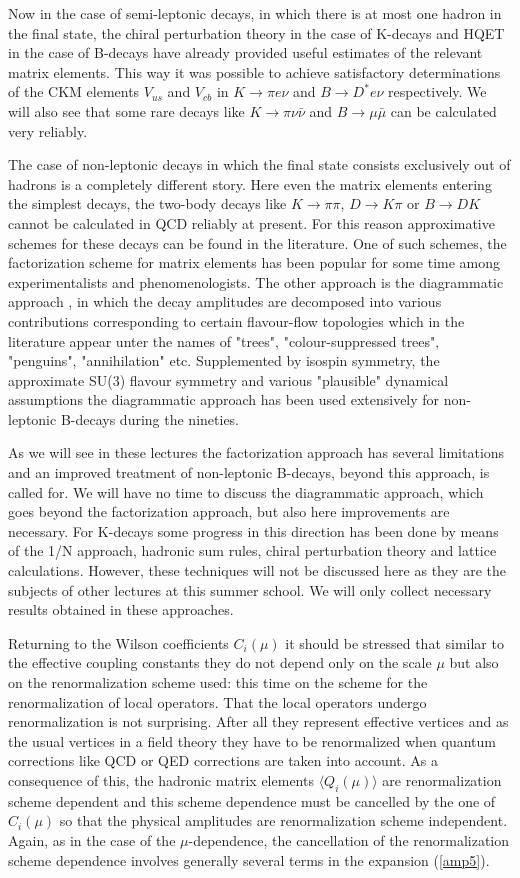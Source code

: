 \documentclass[12pt,rotate]{article}
\begin{document}
Now in the case of semi-leptonic decays, in which there is at most one hadron
in the final state, the chiral perturbation theory in the case of K-decays
and HQET in the case of B-decays have already provided useful estimates of
the relevant matrix elements. This way it was possible to achieve
satisfactory determinations of the CKM elements $V_{us}$ and $V_{cb}$ in 
$K\to\pi e\nu$ and $B\to D^*e\nu$ respectively. 
We will also see that some rare decays like $K\to\pi\nu\bar\nu$ and
$B\to\mu\bar\mu$ can be calculated very reliably.

The case of non-leptonic decays in which the final state consists exclusively
out of hadrons is a completely different story. Here even the matrix
elements entering the simplest decays, the two-body decays like 
$K\to\pi\pi$, $D\to K\pi$ or $B\to DK$ cannot be
calculated in QCD reliably at present. For this reason approximative schemes
for these decays can be found in the literature. One of such schemes, the
factorization scheme for matrix elements has been popular for some time among
experimentalists and phenomenologists. The other approach is the diagrammatic
approach \cite{DIAG}, 
in which the decay amplitudes are decomposed into various
contributions corresponding to certain flavour-flow topologies which in the
literature appear unter the names of "trees", "colour-suppressed trees",
"penguins", "annihilation" etc. Supplemented by isospin symmetry, the
approximate SU(3) flavour symmetry and various "plausible" dynamical
assumptions the diagrammatic approach has been used extensively for
non-leptonic B-decays during the nineties.

As we will see in these lectures the factorization approach 
has several limitations and an improved treatment of
non-leptonic B-decays, beyond this approach, is called for. 
We will have no time to discuss the diagrammatic approach, which goes
beyond the factorization approach, but also here improvements
are necessary.
For K-decays
some progress in this direction has been done by means of the 1/N approach,
hadronic sum rules, chiral perturbation theory and lattice calculations.
However, these techniques will not be discussed here as they are the 
subjects of other lectures at this
summer school. We will only collect necessary results obtained in
these approaches.   

Returning to the Wilson coefficients $C_i(\mu)$ it should be stressed that 
similar
to the effective coupling constants they do not depend only on the scale $\mu$
but also on the renormalization scheme used: this time on the 
scheme for the renormalization of local operators. That the local operators 
undergo renormalization is not surprising. After all they represent effective
vertices and as the usual vertices in a field theory they have to be
renormalized when quantum corrections like QCD or QED corrections are taken
into account. As a consequence of this, the hadronic matrix elements 
$\langle Q_i(\mu)\rangle$
are
renormalization scheme dependent and this scheme dependence must be cancelled
by the one of $C_i(\mu)$ so that the physical amplitudes are 
renormalization scheme
independent. Again, as in the case of the $\mu$-dependence, the 
cancellation of
the renormalization scheme dependence involves generally several 
terms in the
expansion (\ref{amp5}).
\end{document}
